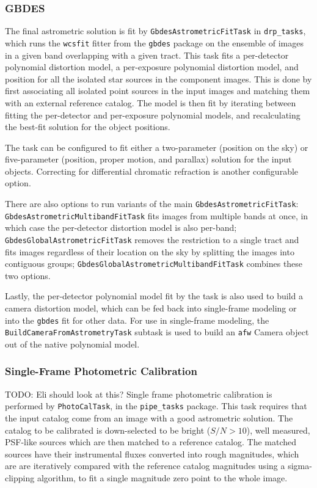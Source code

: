 \subsubsection{GBDES}
\label{sec:gbdes}

The final astrometric solution is fit by \texttt{GbdesAstrometricFitTask} in \texttt{drp\_tasks}, which runs the \texttt{wcsfit} fitter from the \texttt{gbdes} package \citep{2022ascl.soft10011B,2017PASP..129g4503B} on the ensemble of images in a given band overlapping with a given tract.
This task fits a per-detector polynomial distortion model, a per-exposure polynomial distortion model, and position for all the isolated star sources in the component images.
This is done by first associating all isolated point sources in the input images and matching them with an external reference catalog.
The model is then fit by iterating between fitting the per-detector and per-exposure polynomial models, and recalculating the best-fit solution for the object positions.

The task can be configured to fit either a two-parameter (position on the sky) or five-parameter (position, proper motion, and parallax) solution for the input objects.
Correcting for differential chromatic refraction is another configurable option.

There are also options to run variants of the main \texttt{GbdesAstrometricFitTask}: \texttt{GbdesAstrometricMultibandFitTask} fits images from multiple bands at once, in which case the per-detector distortion model is also per-band; \texttt{GbdesGlobalAstrometricFitTask} removes the restriction to a single tract and fits images regardless of their location on the sky by splitting the images into contiguous groups; \texttt{GbdesGlobalAstrometricMultibandFitTask} combines these two options.

Lastly, the per-detector polynomial model fit by the task is also used to build a camera distortion model, which can be fed back into single-frame modeling or into the \texttt{gbdes} fit for other data.
For use in single-frame modeling, the \texttt{BuildCameraFromAstrometryTask} subtask is used to build an \texttt{afw} Camera object out of the native polynomial model.

\subsubsection{Single-Frame Photometric Calibration}
\label{sec:PhotoCal}

TODO: Eli should look at this?
Single frame photometric calibration is performed by \texttt{PhotoCalTask}, in the \texttt{pipe\_tasks} package.
This task requires that the input catalog come from an image with a good astrometric solution.
The catalog to be calibrated is down-selected to be bright ($S/N>10$), well measured, PSF-like sources which are then matched to a reference catalog.
The matched sources have their instrumental fluxes converted into rough magnitudes, which are are iteratively compared with the reference catalog magnitudes using a sigma-clipping algorithm, to fit a single magnitude zero point to the whole image.

